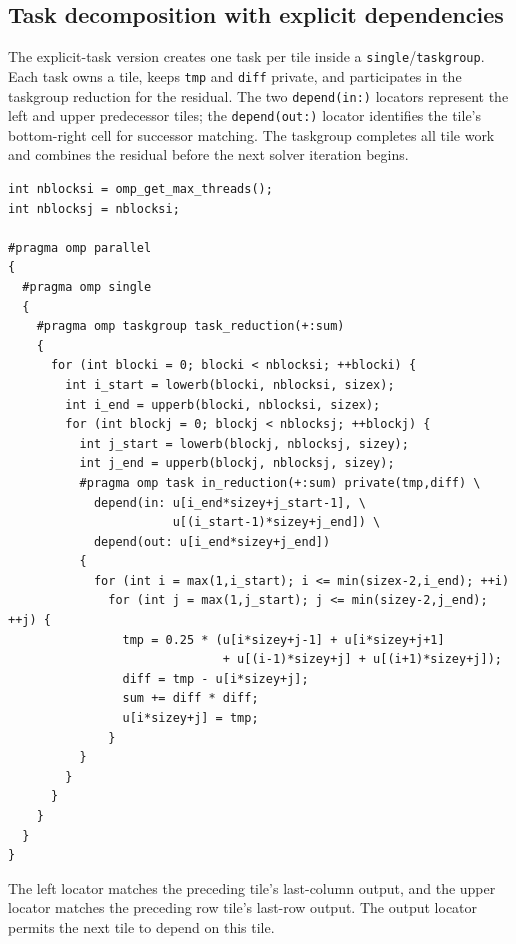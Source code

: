 \documentclass[11pt,a4paper]{article}
\begin{document}
\subsection{Task decomposition with explicit dependencies}

The explicit-task version creates one task per tile inside a
\texttt{single}/\texttt{taskgroup}. Each task owns a tile, keeps
\texttt{tmp} and \texttt{diff} private, and participates in the
taskgroup reduction for the residual. The two \texttt{depend(in:)}
locators represent the left and upper predecessor tiles; the
\texttt{depend(out:)} locator identifies the tile's bottom-right cell
for successor matching. The taskgroup completes all tile work and
combines the residual before the next solver iteration begins.

\begin{lstlisting}[caption={Explicit Gauss--Seidel tile tasks (v1).}]
int nblocksi = omp_get_max_threads();
int nblocksj = nblocksi;

#pragma omp parallel
{
  #pragma omp single
  {
    #pragma omp taskgroup task_reduction(+:sum)
    {
      for (int blocki = 0; blocki < nblocksi; ++blocki) {
        int i_start = lowerb(blocki, nblocksi, sizex);
        int i_end = upperb(blocki, nblocksi, sizex);
        for (int blockj = 0; blockj < nblocksj; ++blockj) {
          int j_start = lowerb(blockj, nblocksj, sizey);
          int j_end = upperb(blockj, nblocksj, sizey);
          #pragma omp task in_reduction(+:sum) private(tmp,diff) \
            depend(in: u[i_end*sizey+j_start-1], \
                       u[(i_start-1)*sizey+j_end]) \
            depend(out: u[i_end*sizey+j_end])
          {
            for (int i = max(1,i_start); i <= min(sizex-2,i_end); ++i)
              for (int j = max(1,j_start); j <= min(sizey-2,j_end); ++j) {
                tmp = 0.25 * (u[i*sizey+j-1] + u[i*sizey+j+1]
                              + u[(i-1)*sizey+j] + u[(i+1)*sizey+j]);
                diff = tmp - u[i*sizey+j];
                sum += diff * diff;
                u[i*sizey+j] = tmp;
              }
          }
        }
      }
    }
  }
}
\end{lstlisting}

The left locator matches the preceding tile's last-column output, and
the upper locator matches the preceding row tile's last-row output.
The output locator permits the next tile to depend on this tile.


\end{document}
